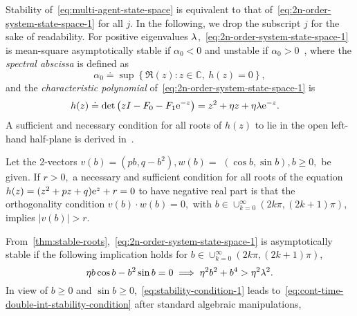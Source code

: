 Stability of~\eqref{eq:multi-agent-state-space}
is equivalent to that of~\eqref{eq:2n-order-system-state-space-1} for all $ j $.
In the following, we drop the subscript $ j $ for the sake of readability.
For positive eigenvalues $ \lambda $,~\eqref{eq:2n-order-system-state-space-1} is mean-square asymptotically stable
if $ \alpha_0 < 0 $ and unstable if $ \alpha_0 > 0 $~\cite{wangBoundedness}, where the \emph{spectral abscissa} is defined as
\begin{equation}\label{eq:2nd-order-system-stability-condition}
	\alpha_0 \doteq \sup\left\lbrace\Re(z) : z\in \mathbb{C}, \ h(z) = 0 \right\rbrace,
\end{equation}
and the \emph{characteristic polynomial} of~\eqref{eq:2n-order-system-state-space-1} is
\begin{equation}\label{eq:2n-order-system-chacteristic-polynomial}
	\begin{aligned}
		h(z) &\doteq \det\left(zI - F_0 - F_{1}\e^{-z}\right) = z^2 + \gvel z + \gvel\gpos\e^{-z}.  %
	\end{aligned}
\end{equation}
A sufficient and necessary condition for all roots of $ h(z) $ to lie in the open left-hand half-plane is derived in~\cite{BAPTISTINI1997259}.
\begin{thm}\label{thm:stable-roots}
	Let the 2-vectors $v(b)=\left(p b, q-b^{2}\right), w(b)=$ $(\cos b, \sin b), b \geq 0,$ be given. If $r>0,$ a necessary and sufficient condition for all roots of the equation $h(z)=(z^2+pz+q)\mathrm{e}^{z} + r=0$ to have negative real part is that the orthogonality condition $v(b) \cdot w(b)=0,$ with $b \in \cup_{k=0}^{\infty}(2 k \pi,(2 k+1) \pi),$ implies $|v(b)|>r$.
\end{thm}
From~\cref{thm:stable-roots},~\eqref{eq:2n-order-system-state-space-1}
is asymptotically stable if the following implication holds for $b \in \cup_{k=0}^{\infty}(2 k \pi,(2 k+1) \pi)$,
\begin{equation}\label{eq:stability-condition-1}
	\eta b\cos b - b^2\sin b = 0 \implies \eta^2b^2+b^4>\eta^2\lambda^2.
\end{equation}
In view of $ b \ge 0 $ and $ \sin b \ge 0 $,~\eqref{eq:stability-condition-1}
leads to~\eqref{eq:cont-time-double-int-stability-condition} after standard algebraic manipulations,
